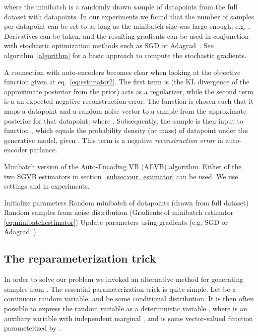 \documentclass{article} \usepackage{nips13submit_e,times}
\theoremstyle{definition}
\theoremstyle{definition}
\begin{document}
where the minibatch  is a randomly drawn sample of  datapoints from the full dataset  with  datapoints. In our experiments we found that the number of samples  per datapoint can be set to  as long as the minibatch size  was large enough, e.g. . Derivatives  can be taken, and the resulting gradients can be used in conjunction with stochastic optimization methods such as SGD or Adagrad~\cite{duchi2010adaptive}. See algorithm~\ref{algorithm} for a basic approach to compute the stochastic gradients.

A connection with auto-encoders becomes clear when looking at the objective function given at eq.~\eqref{eq:estimator2}. The first term is (the KL divergence of the approximate posterior from the prior) acts as a regularizer, while the second term is a an expected negative reconstruction error. 
The function  is chosen such that it maps a datapoint  and a random noise vector  to a sample from the approximate posterior for that datapoint:  where . 
Subsequently, the sample  is then input to function , which equals the probability density (or mass) of datapoint  under the generative model, given . This term is a negative \emph{reconstruction error} in auto-encoder parlance.

\begin{algorithm}[t]
\caption{Minibatch version of the Auto-Encoding VB (AEVB) algorithm. Either of the two SGVB estimators in section~\ref{subsec:our_estimator} can be used. We use settings  and  in experiments. }
\renewcommand{\algorithmicforall}{\textbf{for each}}
\begin{algorithmic}
\State  Initialize parameters
\Repeat
\State  Random minibatch of  datapoints (drawn from full dataset)
\State  Random samples from noise distribution 
\State  (Gradients of minibatch estimator \eqref{eq:minibatchestimator})
\State  Update parameters using gradients  (e.g. SGD or Adagrad~\cite{duchi2010adaptive})
\\ \Return 
\end{algorithmic}
\label{algorithm}
\end{algorithm}

\subsection{The reparameterization trick}
\label{subsec:thetrick}





In order to solve our problem we invoked an alternative method for generating samples from . The essential parameterization trick is quite simple. Let  be a continuous random variable, and  be some conditional distribution. It is then often possible to express the random variable  as a deterministic variable , where  is an auxiliary variable with independent marginal , and  is some vector-valued function parameterized by .
\end{document}
